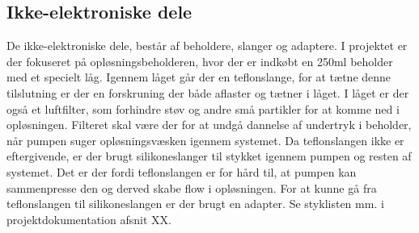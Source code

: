 \subsection{Ikke-elektroniske dele}
De ikke-elektroniske dele, består af beholdere, slanger og adaptere. I projektet er der fokuseret på opløsningsbeholderen, hvor der er indkøbt en 250ml beholder med et specielt låg. Igennem låget går der en teflonslange, for at tætne denne tilslutning er der en forskruning der både aflaster og tætner i låget. I låget er der også et luftfilter, som forhindre støv og andre små partikler for at komme ned i opløsningen. Filteret skal være der for at undgå dannelse af undertryk i beholder, når pumpen suger opløsningsvæsken igennem systemet. Da teflonslangen ikke er eftergivende, er der brugt silikoneslanger til stykket igennem pumpen og resten af systemet. Det er der fordi teflonslangen er for hård til, at pumpen kan sammenpresse den og derved skabe flow i opløsningen. For at kunne gå fra teflonslangen til silikoneslangen er der brugt en adapter. Se styklisten mm. i projektdokumentation afsnit XX.



